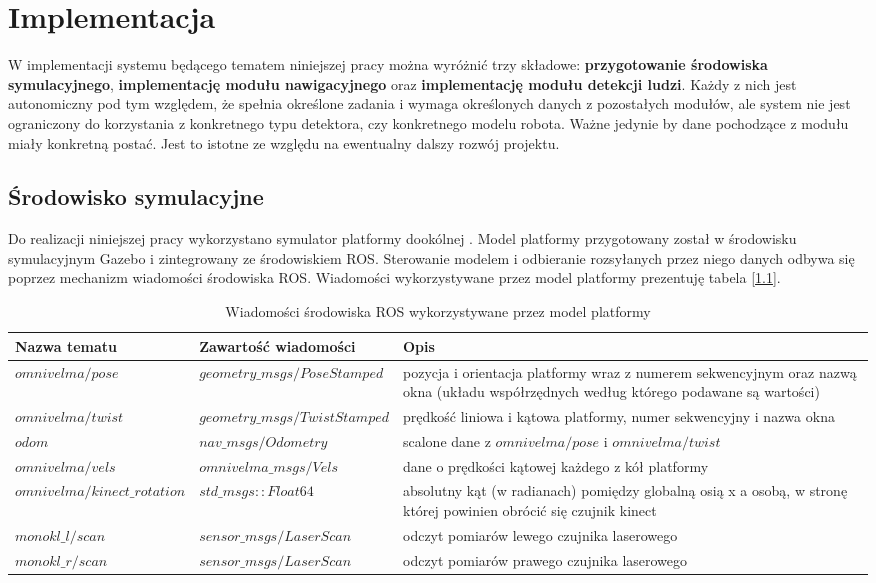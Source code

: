 \chapter{Implementacja}


W implementacji systemu będącego tematem niniejszej pracy można wyróżnić trzy składowe: \textbf{przygotowanie środowiska symulacyjnego}, \textbf{implementację modułu nawigacyjnego} oraz \textbf{implementację modułu detekcji ludzi}. Każdy z nich jest autonomiczny pod tym względem, że spełnia określone zadania i wymaga określonych danych z pozostałych modułów, ale system nie jest ograniczony do korzystania z konkretnego typu detektora, czy konkretnego modelu robota. Ważne jedynie by dane pochodzące z modułu miały konkretną postać. Jest to istotne ze względu na ewentualny dalszy rozwój projektu.

\section{Środowisko symulacyjne}

Do realizacji niniejszej pracy wykorzystano symulator platformy dookólnej \cite{omnivelma}. Model platformy przygotowany został w środowisku symulacyjnym Gazebo i zintegrowany ze środowiskiem ROS. Sterowanie modelem i odbieranie rozsyłanych przez niego danych odbywa się poprzez mechanizm wiadomości środowiska ROS. Wiadomości wykorzystywane przez model platformy prezentuję tabela [\ref{tab:topics}].


\begin{table}[H]
\centering
\small
\begin{tabular}{p{5cm}|p{5.5cm}|p{4cm}} 
  \hline 
  Nazwa tematu & Zawartość wiadomości & Opis\\
  \hline
  $omnivelma/pose$ & $geometry\_msgs/PoseStamped$ & pozycja i orientacja platformy wraz z numerem sekwencyjnym oraz nazwą okna (układu współrzędnych według którego podawane są wartości)\\
  \hline
  $omnivelma/twist$ & $geometry\_msgs/TwistStamped$ & prędkość liniowa i kątowa platformy, numer sekwencyjny i nazwa okna\\
  \hline
  $odom$ & $nav\_msgs/Odometry$ & scalone dane z $omnivelma/pose$ i $omnivelma/twist$\\
  \hline
  $omnivelma/vels$ & $omnivelma\_msgs/Vels$ & dane o prędkości kątowej każdego z kół platformy\\
  \hline
 $omnivelma/kinect\_rotation$ & $std\_msgs::Float64$ & absolutny kąt (w radianach) pomiędzy globalną osią x a osobą, w stronę której powinien obrócić się czujnik kinect\\
  \hline
$monokl\_l/scan$ & $sensor\_msgs/LaserScan$ & odczyt pomiarów lewego czujnika laserowego\\
  \hline
  $monokl\_r/scan$ & $sensor\_msgs/LaserScan$ & odczyt pomiarów prawego czujnika laserowego\\
  \hline
\end{tabular} 
\caption{Wiadomości środowiska ROS wykorzystywane przez model platformy}
\label{tab:topics}
\end{table}

